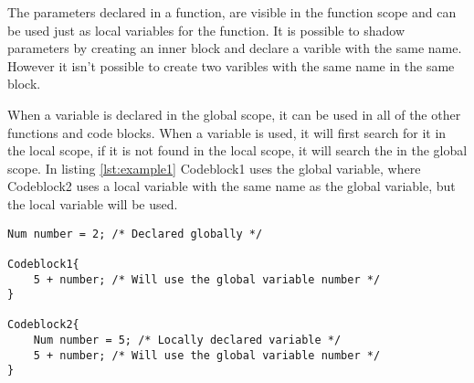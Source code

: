 The parameters declared in a function, are visible in the function scope and can be used just as local variables for the function. It is possible to shadow parameters by creating an inner block and declare a varible with the same name. However it isn't possible to create two varibles with the same name in the same block. 

When a variable is declared in the global scope, it can be used in all of the other functions and code blocks. When a variable is used, it will first search for it in the local scope, if it is not found in the local scope, it will search the in the global scope. In listing \ref{lst:example1} Codeblock1 uses the global variable, where Codeblock2 uses a local variable with the same name as the global variable, but the local variable will be used.


\begin{lstlisting}[caption={Example of global scoping rules},  xleftmargin=.2\textwidth, label={lst:example1}]
Num number = 2; /* Declared globally */

Codeblock1{
	5 + number; /* Will use the global variable number */
}

Codeblock2{
	Num number = 5; /* Locally declared variable */
	5 + number; /* Will use the global variable number */
}
\end{lstlisting}

